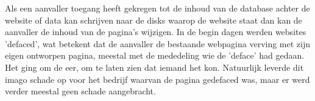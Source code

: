 Als een aanvaller toegang heeft gekregen tot de inhoud van de database achter de website of data kan schrijven naar de disks waarop de website staat dan kan de aanvaller de inhoud van de pagina's wijzigen. In de begin dagen werden websites 'defaced', wat betekent dat de aanvaller de bestaande webpagina verving met zijn eigen ontworpen pagina, meestal met de mededeling wie de 'deface' had gedaan. Het ging om de eer, om te laten zien dat iemand het kon. Natuurlijk leverde dit imago schade op voor het bedrijf waarvan de pagina gedefaced was, maar er werd verder meestal geen schade aangebracht.
